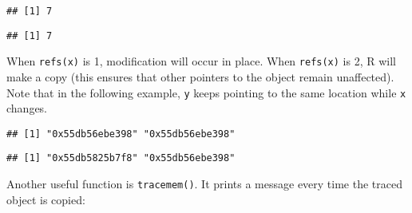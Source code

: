 \begin{verbatim}
## [1] 7
\end{verbatim}

\begin{Shaded}
\begin{Highlighting}[]
\StringTok{ }\OperatorTok{:}
\StringTok{ }
\StringTok{ }
\end{Highlighting}
\end{Shaded}

\begin{verbatim}
## [1] 7
\end{verbatim}

When \texttt{refs(x)} is 1, modification will occur in place. When
\texttt{refs(x)} is 2, R will make a copy (this ensures that other
pointers to the object remain unaffected). Note that in the following
example, \texttt{y} keeps pointing to the same location while \texttt{x}
changes.

\begin{Shaded}
\begin{Highlighting}[]
\StringTok{ }\OperatorTok{:}
\StringTok{ }
\NormalTok{(}
\end{Highlighting}
\end{Shaded}

\begin{verbatim}
## [1] "0x55db56ebe398" "0x55db56ebe398"
\end{verbatim}

\begin{Shaded}
\begin{Highlighting}[]
\NormalTok{x[}\NormalTok{] <-}\StringTok{ }
\NormalTok{(}
\end{Highlighting}
\end{Shaded}

\begin{verbatim}
## [1] "0x55db5825b7f8" "0x55db56ebe398"
\end{verbatim}

Another useful function is \texttt{tracemem()}. It prints a message
every time the traced object is copied: 

